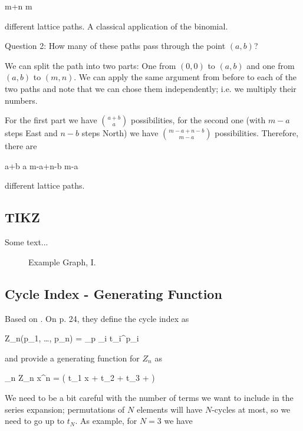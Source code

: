 \bee
{m+n \choose m}
\eee

different lattice paths. A classical application of the binomial.

Question 2: How many of these paths pass through the point $(a, b)$?

We can split the path into two parts: One from $(0,0)$ to $(a,b)$ and one from $(a,b)$ to $(m,n)$. We can apply the same argument from before to each of the two paths and note that we can chose them independently; i.e. we multiply their numbers.

For the first part we have ${a+b \choose a}$ possibilities, for the second one (with $m-a$ steps East and $n-b$ steps North) we have ${m-a+n-b \choose m-a}$ possibilities. Therefore, there are

\bee
{a+b \choose a} {m-a+n-b \choose m-a}
\eee

different lattice paths.

\subsection{TIKZ}

Some text...

\begin{figure}[H]
\centering
{}
\caption{Example Graph, I.}
\end{figure}


\subsection{Cycle Index - Generating Function}

Based on \cite{Stanley2012}. On p. 24, they define the cycle index as

\bee
Z_n(p_1, \ldots, p_n) =  \sum_p \prod_i t_i^{p_i}
\eee

and provide a generating function for $Z_n$ as

\bee
\sum_n Z_n x^n = \exp \left( t_1 x + t_2  + t_3  + \cdots \right)
\eee

We need to be a bit careful with the number of terms we want to include in the series expansion; permutations of $N$ elements will have $N$-cycles at most, so we need to go up to $t_N$. As example, for $N=3$ we have

